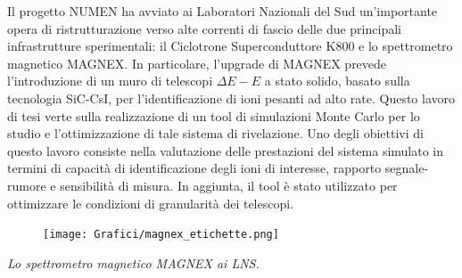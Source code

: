 \documentclass[10pt,foldmark,notumble]{leaflet}
\newcommand{\geant}{Geant4}
\begin{document}
Il progetto NUMEN ha avviato ai Laboratori Nazionali del Sud un'importante opera di ristrutturazione verso alte correnti di fascio delle due principali infrastrutture sperimentali: il Ciclotrone Superconduttore K800 e lo spettrometro magnetico MAGNEX.
In particolare, l'upgrade di MAGNEX prevede l'introduzione di un muro di telescopi $\Delta E - E$ a stato solido, basato sulla tecnologia SiC-CsI, per l'identificazione di ioni pesanti ad alto rate.
Questo lavoro di tesi verte sulla realizzazione di un tool di simulazioni Monte Carlo per lo studio e l'ottimizzazione di tale sistema di rivelazione.
Uno degli obiettivi di questo lavoro consiste nella valutazione delle prestazioni del sistema simulato in termini di capacità di identificazione degli ioni di interesse, rapporto segnale-rumore e sensibilità di misura.
In aggiunta, il tool è stato utilizzato per ottimizzare le condizioni di granularità dei telescopi.



\begin{figure} [!h]
	\centering
	\texttt{[image: Grafici/magnex\_etichette.png]}
\end{figure}
\hspace{0.8 cm}\textit{ Lo spettrometro magnetico MAGNEX ai LNS.}


\end{document}
